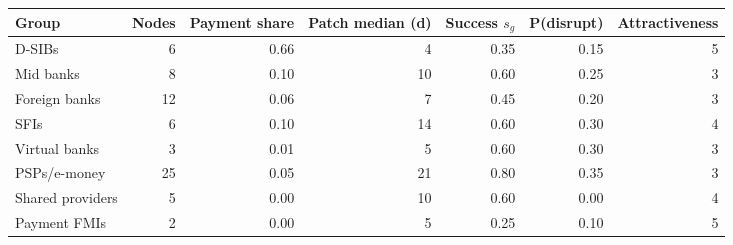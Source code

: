 \begin{tabular}{lrrrrrr}
\toprule
Group & Nodes & Payment share & Patch median (d) & Success $s_g$ & P(disrupt) & Attractiveness \\
\midrule
D-SIBs & 6 & 0.66 & 4 & 0.35 & 0.15 & 5 \\
Mid banks & 8 & 0.10 & 10 & 0.60 & 0.25 & 3 \\
Foreign banks & 12 & 0.06 & 7 & 0.45 & 0.20 & 3 \\
SFIs & 6 & 0.10 & 14 & 0.60 & 0.30 & 4 \\
Virtual banks & 3 & 0.01 & 5 & 0.60 & 0.30 & 3 \\
PSPs/e-money & 25 & 0.05 & 21 & 0.80 & 0.35 & 3 \\
Shared providers & 5 & 0.00 & 10 & 0.60 & 0.00 & 4 \\
Payment FMIs & 2 & 0.00 & 5 & 0.25 & 0.10 & 5 \\
\bottomrule
\end{tabular}